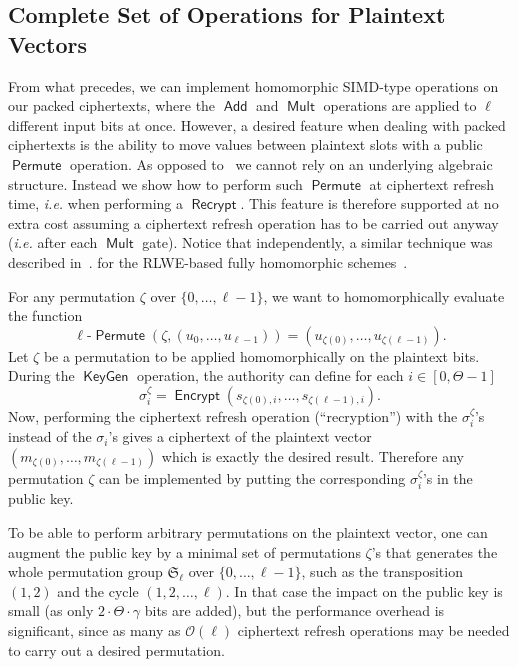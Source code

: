 \documentclass{llncs}
\newcommand{\ie}{\textsl{i.e.}\xspace}
\DeclareMathOperator{\KeyGen}{\ensuremath{\mathsf{KeyGen}}}
\DeclareMathOperator{\Encrypt}{\ensuremath{\mathsf{Encrypt}}}
\DeclareMathOperator{\Recrypt}{\ensuremath{\mathsf{Recrypt}}}
\DeclareMathOperator{\Add}{\ensuremath{\mathsf{Add}}}
\DeclareMathOperator{\Mult}{\ensuremath{\mathsf{Mult}}}
\DeclareMathOperator{\Permute}{\ensuremath{\mathsf{Permute}}}
\renewcommand*\O{\ensuremath{\mathcal O}}
\begin{document}
\subsection{Complete Set of Operations for Plaintext Vectors}\label{subsec:permutations}

From what precedes, we can implement homomorphic SIMD-type operations on
our packed ciphertexts, where the $\Add$ and $\Mult$ operations are
applied to $\ell$ different input bits at once. However, a desired
feature when dealing with packed ciphertexts is the ability to move
values between plaintext slots with a public $\Permute$ operation. As opposed to~\cite{GHS2012a} we cannot rely on an underlying algebraic structure.
Instead we show how to perform  such $\Permute$ at ciphertext refresh
time, \ie when performing a  $\Recrypt$.
This feature is therefore supported at no extra cost assuming a
ciphertext refresh operation has to be carried out anyway (\ie after each
$\Mult$ gate). Notice that independently, a similar technique was
described
in~\cite{BGH2013}.
for the RLWE-based fully homomorphic schemes~\cite{BV2011a,BV2011b,GHS2012a}.


For any permutation $\zeta$ over $\{0,\ldots,{\ell-1}\}$, we want to homomorphically evaluate the function
\[ \text{$\ell$-$\Permute$}\left(\zeta,\left(u_0,\ldots,u_{\ell-1}\right)\right) = \left(u_{\zeta(0)},\ldots,u_{\zeta({\ell-1})}\right). \]
Let $\zeta$ be a permutation to be applied  homomorphically on the plaintext bits. During the $\KeyGen$ operation, the authority can define for each $i\in[0,\Theta-1]$
\[ \sigma_{i}^{\zeta} = \Encrypt(s_{\zeta(0),i},\ldots,s_{\zeta(\ell-1),i}). \]
Now, performing the ciphertext refresh operation (``recryption'') with the $\sigma_i^\zeta$'s instead of the $\sigma_i$'s gives a ciphertext of the plaintext vector
$(m_{\zeta(0)},\ldots,m_{\zeta(\ell-1)})$
which is exactly the desired result. Therefore any permutation $\zeta$
can be implemented by putting the corresponding $\sigma^\zeta_i$'s in the public key.

To be able to perform arbitrary permutations on the plaintext vector, one
can augment the public key by a minimal set of permutations $\zeta$'s
that generates the whole permutation group $\mathfrak S_\ell$ over $\{0,\ldots,\ell-1\}$, such as
the transposition $(1,2)$ and the cycle $(1,2,\ldots,\ell)$. In that case
the impact on the public key is small (as only $2\cdot \Theta\cdot
\gamma$ bits are added), but the performance overhead is significant,
since as many as $\O(\ell)$ ciphertext refresh operations may be needed to
carry out a desired permutation.
\end{document}
